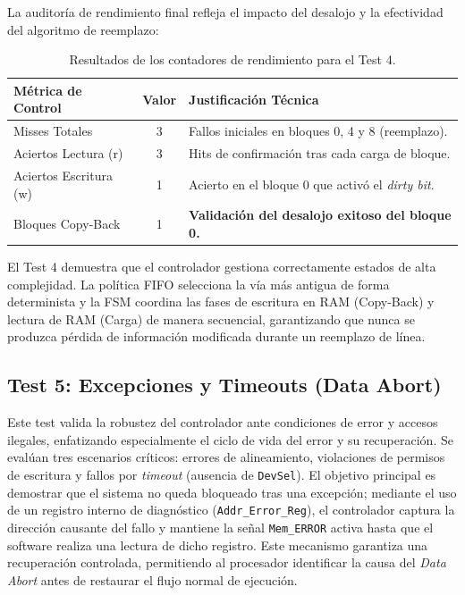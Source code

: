 \documentclass[12pt,a4paper]{article}
\begin{document}
La auditoría de rendimiento final refleja el impacto del desalojo y la efectividad del algoritmo de reemplazo:

\begin{table}[H]
\centering
\small
\renewcommand{\arraystretch}{1.2}
\begin{tabular}{|l|c|l|}
\hline
\rowcolor[HTML]{EFEFEF} 
\textbf{Métrica de Control} & \textbf{Valor} & \textbf{Justificación Técnica} \\ \hline
Misses Totales & 3 & Fallos iniciales en bloques 0, 4 y 8 (reemplazo). \\ \hline
Aciertos Lectura (r) & 3 & Hits de confirmación tras cada carga de bloque. \\ \hline
Aciertos Escritura (w) & 1 & Acierto en el bloque 0 que activó el \textit{dirty bit}. \\ \hline
Bloques Copy-Back & 1 & \textbf{Validación del desalojo exitoso del bloque 0.} \\ \hline
\end{tabular}
\caption{Resultados de los contadores de rendimiento para el Test 4.}
\label{tab:audit_test4}
\end{table}

El Test 4 demuestra que el controlador gestiona correctamente estados de alta complejidad. La política FIFO selecciona la vía más antigua de forma determinista y la FSM coordina las fases de escritura en RAM (Copy-Back) y lectura de RAM (Carga) de manera secuencial, garantizando que nunca se produzca pérdida de información modificada durante un reemplazo de línea.

\newpage

\subsection{Test 5: Excepciones y Timeouts (Data Abort)}

Este test valida la robustez del controlador ante condiciones de error y accesos ilegales, enfatizando especialmente el ciclo de vida del error y su recuperación. Se evalúan tres escenarios críticos: errores de alineamiento, violaciones de permisos de escritura y fallos por \textit{timeout} (ausencia de \texttt{DevSel}). El objetivo principal es demostrar que el sistema no queda bloqueado tras una excepción; mediante el uso de un registro interno de diagnóstico (\texttt{Addr\_Error\_Reg}), el controlador captura la dirección causante del fallo y mantiene la señal \texttt{Mem\_ERROR} activa hasta que el software realiza una lectura de dicho registro. Este mecanismo garantiza una recuperación controlada, permitiendo al procesador identificar la causa del \textit{Data Abort} antes de restaurar el flujo normal de ejecución.
\end{document}
